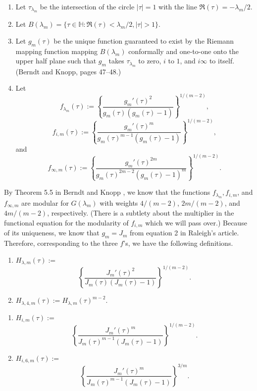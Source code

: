 \documentclass{article}
\begin{document}
\begin{definition}
\begin{enumerate}
\item Let $\tau_{\lambda_m}$ be the intersection
of the circle $|\tau| = 1$
with the line $\Re(\tau) = -\lambda_m/2$.
\item Let $B(\lambda_m)= \{\tau \in \mathbb{H}:
\Re(\tau) < \lambda_m/2,  |\tau| > 1\}$. 
\item Let $g_m(\tau)$ be the unique 
function guaranteed
to exist by the Riemann mapping function
mapping $B(\lambda_m)$ conformally
and one-to-one onto the upper half plane
such that $g_m$ takes  $\tau_{\lambda_m}$
to zero, $i$ to $1$, and $i\infty$ to itself.
(Berndt and Knopp, pages 47--48.) 
\item Let
 $$
 f_{\lambda_m}(\tau)
 :=\left \{
 \frac {g_m'(\tau)^2}
 {g_m(\tau)(g_m(\tau) -1)}
 \right \}^{1/(m-2)},
 $$
 $$
 f_{i,m}(\tau):=
 \left \{
 \frac {g_m'(\tau)^m}
 {g_m(\tau)^{m-1} (g_m(\tau) - 1)}
 \right \}^{1/(m-2)},
 $$
 and
 $$
 f_{\infty,m}(\tau) := 
 \left \{ \frac{g_m'(\tau)^{2m}}
 {g_m(\tau)^{2m-2}(g_m(\tau)-1)^m}
\right \}^{1/(m-2)}.
 $$
 \end{enumerate}
 \end{definition}
 \noindent
By Theorem 5.5 in Berndt and Knopp 
\cite{berndt2008hecke},
we know that the functions $f_{\lambda_m},
f_{i,m}$, and $f_{\infty,m}$ are modular
for $G(\lambda_m)$ with weights
$4/(m-2)$, $2m/(m-2)$, and $4m/(m-2)$,
respectively. 
(There is a
subtlety about the multiplier in
the functional equation for the
modularity of $f_{i,m}$ which we will pass over.)
\newline \newline \noindent
Because of its uniqueness,
we know that $g_m = J_m$ 
from equation 2 in Raleigh's article.
Therefore, corresponding to the three $f$'s,
we have the following definitions.
\begin{definition}
\begin{enumerate}
\item 
$H_{\lambda, m}(\tau) :=$ 
 $$\left \{
 \frac {J_m'(\tau)^2}
 {J_m(\tau)(J_m(\tau) -1)}
 \right \}^{1/(m-2)}.$$
 \item $H_{\lambda,4,m} (\tau) :=
 H_{\lambda, m}(\tau)^{m-2}.$
 \end{enumerate}
 \end{definition}
 \begin{definition}
 \begin{enumerate}
 \item 
  $H_{i,m}(\tau):=$ 
  $$
\left \{
 \frac {J_m'(\tau)^m}
 {J_m(\tau)^{m-1} (J_m(\tau) - 1)}
 \right \}^{1/(m-2)}.$$
 \item  $H_{i,6,m}(\tau):=$
  $$
\left \{
 \frac {J_m'(\tau)^m}
 {J_m(\tau)^{m-1} (J_m(\tau) - 1)}
 \right \}^{3/m}.$$
 \end{enumerate}
 \end{definition} 
\end{document}
